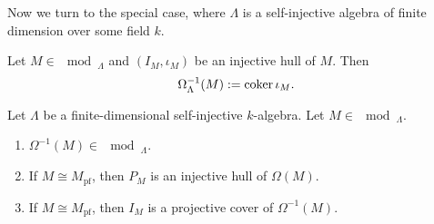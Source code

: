 %




Now we turn to the special case, where $\Lambda$ is a self-injective algebra of finite
dimension over some field $k$.


\begin{definition}
  Let $M \in \mod_\Lambda$ and $(I_M, \iota _M)$ be an injective hull of $M$. Then
  \[\Omega_\Lambda^{-1}(M) := \operatorname{coker} \iota _M.\]
\end{definition}


\begin{lemma}\label{2.2.6}
Let $\Lambda$ be a finite-dimensional self-injective $k$-algebra. Let $M\in \mod_\Lambda$.
\begin{enumerate}
\item $\Omega^{-1}(M) \in  \mod_\Lambda$.
\item If $M \cong  M_{\mathrm{pf}}$, then $P_M$ is an injective hull of $\Omega(M)$.
\item If $M \cong  M_{\mathrm{pf}}$, then $I_M$ is a projective cover of $\Omega^{-1}(M)$.
\end{enumerate}
\end{lemma}


